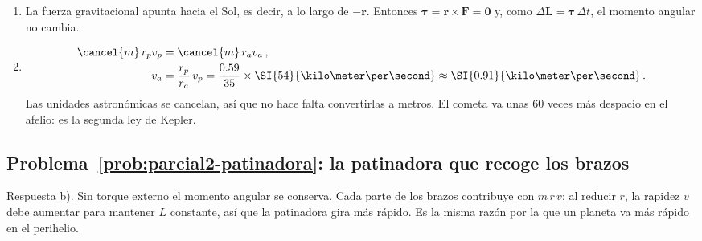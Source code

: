 \documentclass[11pt,a4paper]{book}
\begin{document}
\begin{enumerate}[label=\alph*)]
    \item La fuerza gravitacional apunta hacia el Sol, es decir, a lo largo de
    $-\boldsymbol{r}$. Entonces
    $\boldsymbol{\tau} = \boldsymbol{r}\times\boldsymbol{F} = \boldsymbol{0}$
    y, como $\Delta\boldsymbol{L} = \boldsymbol{\tau}\,\Delta t$, el momento
    angular no cambia.
    \item
    \begin{align}
        \cancel{m}\, r_p v_p &= \cancel{m}\, r_a v_a\,, \nonumber\\
        v_a &= \frac{r_p}{r_a}\,v_p
             = \frac{0.59}{35} \times \SI{54}{\kilo\meter\per\second}
             \approx \SI{0.91}{\kilo\meter\per\second}\,.
    \end{align}
    Las unidades astronómicas se cancelan, así que no hace falta convertirlas
    a metros. El cometa va unas 60 veces más despacio en el afelio: es la
    segunda ley de Kepler.
\end{enumerate}

\subsection*{Problema~\ref{prob:parcial2-patinadora}: la patinadora que recoge los brazos}
\label{sol:parcial2-patinadora}

Respuesta b). Sin torque externo el momento angular se conserva. Cada parte
de los brazos contribuye con $m\,r\,v$; al reducir $r$, la rapidez $v$ debe
aumentar para mantener $L$ constante, así que la patinadora gira más rápido.
Es la misma razón por la que un planeta va más rápido en el perihelio.
\end{document}
